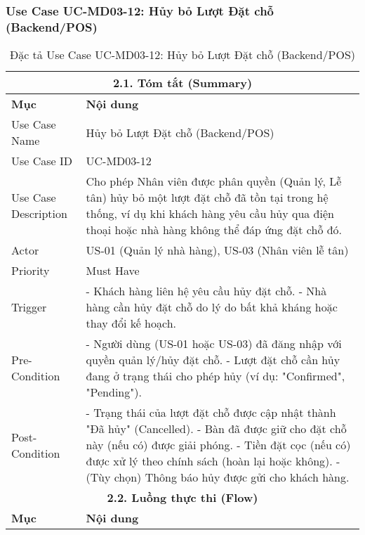 \subsubsection{Use Case UC-MD03-12: Hủy bỏ Lượt Đặt chỗ (Backend/POS)}
\begin{longtable}{|m{4cm}|p{11cm}|}
\caption{Đặc tả Use Case UC-MD03-12: Hủy bỏ Lượt Đặt chỗ (Backend/POS)} \label{tab:uc_md03_12_revised_v3} \\
\hline
\multicolumn{2}{|c|}{\textbf{2.1. Tóm tắt (Summary)}} \\
\hline
\textbf{Mục} & \textbf{Nội dung} \\
\hline
\endhead %
\hline
\endfoot %
\hline
\endlastfoot %
Use Case Name & Hủy bỏ Lượt Đặt chỗ (Backend/POS) \\
\hline
Use Case ID & UC-MD03-12 \\
\hline
Use Case Description & Cho phép Nhân viên được phân quyền (Quản lý, Lễ tân) hủy bỏ một lượt đặt chỗ đã tồn tại trong hệ thống, ví dụ khi khách hàng yêu cầu hủy qua điện thoại hoặc nhà hàng không thể đáp ứng đặt chỗ đó. \\
\hline
Actor & US-01 (Quản lý nhà hàng), US-03 (Nhân viên lễ tân) \\
\hline
Priority & Must Have \\
\hline
Trigger & - Khách hàng liên hệ yêu cầu hủy đặt chỗ. \newline - Nhà hàng cần hủy đặt chỗ do lý do bất khả kháng hoặc thay đổi kế hoạch. \\
\hline
Pre-Condition & - Người dùng (US-01 hoặc US-03) đã đăng nhập với quyền quản lý/hủy đặt chỗ. \newline - Lượt đặt chỗ cần hủy đang ở trạng thái cho phép hủy (ví dụ: "Confirmed", "Pending"). \\
\hline
Post-Condition & - Trạng thái của lượt đặt chỗ được cập nhật thành "Đã hủy" (Cancelled). \newline - Bàn đã được giữ cho đặt chỗ này (nếu có) được giải phóng. \newline - Tiền đặt cọc (nếu có) được xử lý theo chính sách (hoàn lại hoặc không). \newline - (Tùy chọn) Thông báo hủy được gửi cho khách hàng. \\
\hline
\multicolumn{2}{|c|}{\textbf{2.2. Luồng thực thi (Flow)}} \\
\hline
\textbf{Mục} & \textbf{Nội dung} \\
\hline

\end{longtable}
